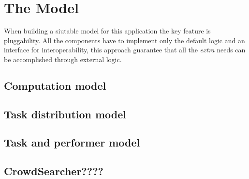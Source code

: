 
\chapter{The Model}
\label{cap:model}

When building a siutable model for this application the key feature is pluggability.
All the components have to implement only the default logic and an interface for interoperability, this approach guarantee
that all the \emph{extra} needs can be accomplished through external logic.





\section{Computation model}
\label{sec:model:computation}


\section{Task distribution model}
\label{sec:model:distribution}


\section{Task and performer model}
\label{sec:model:performer}



\section{CrowdSearcher????}
\label{sec:model:cs}
